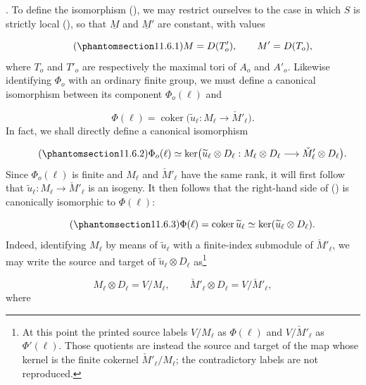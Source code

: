
\medskip
\noindent
{}. To define the isomorphism (), we may restrict ourselves to
the case in which $S$ is strictly local (), so that $\underline M$
and $\underline M'$ are constant, with values

\begin{equation}\tag{\SGARefTarget{sga7.sga7i.eix.n11-6-1}{11.6.1}}
M=D(T'_o),\qquad M'=D(T_o),
\end{equation}
where $T_o$ and $T'_o$ are respectively the maximal tori of $A_o$ and
$A'_o$. Likewise identifying $\Phi_o$ with an ordinary finite group,
we must define a canonical isomorphism between its component
$\Phi_o(\ell)$ and

\begin{equation*}
\Phi(\ell)=\operatorname{coker}\bigl(
 \widetilde u_\ell:M_\ell\longrightarrow\check M'_\ell\bigr).
\end{equation*}
In fact, we shall directly define a canonical isomorphism

\begin{equation}\tag{\SGARefTarget{sga7.sga7i.eix.n11-6-2}{11.6.2}}
\Phi_o(\ell)\simeq
 \ker\bigl(\widetilde u_\ell\otimes D_\ell:
 M_\ell\otimes D_\ell\longrightarrow
 \check M'_\ell\otimes D_\ell\bigr).
\end{equation}
Since $\Phi_o(\ell)$ is finite and $M_\ell$ and $\check M'_\ell$ have
the same rank, it will first follow that
$\widetilde u_\ell:M_\ell\to\check M'_\ell$ is an isogeny. It then
follows that the right-hand side of () is canonically isomorphic
to $\Phi(\ell)$:

\begin{equation}\tag{\SGARefTarget{sga7.sga7i.eix.n11-6-3}{11.6.3}}
\Phi(\ell)=\operatorname{coker}\widetilde u_\ell
 \simeq
 \ker(\widetilde u_\ell\otimes D_\ell).
\end{equation}
Indeed, identifying $M_\ell$ by means of $\widetilde u_\ell$ with a
finite-index submodule of $\check M'_\ell$, we may write the source and
target of $\widetilde u_\ell\otimes D_\ell$ as\footnote{At this point
the printed source labels $V/M_\ell$ as $\Phi(\ell)$ and
$V/\check M'_\ell$ as $\Phi'(\ell)$. Those quotients are instead the
source and target of the map whose kernel is the finite cokernel
$\check M'_\ell/M_\ell$; the contradictory labels are not reproduced.}

\begin{equation*}
M_\ell\otimes D_\ell=V/M_\ell,\qquad
\check M'_\ell\otimes D_\ell=V/\check M'_\ell,
\end{equation*}
where

